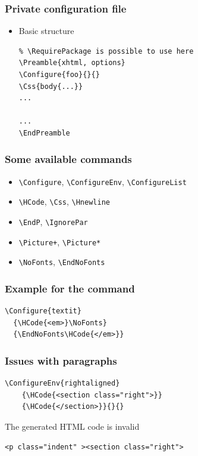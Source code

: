 \begin{frame}[fragile]
  \frametitle{Private configuration file}
  \begin{itemize}
    \item Basic structure
      \begin{verbatim}
% \RequirePackage is possible to use here
\Preamble{xhtml, options}
\Configure{foo}{}{}
\Css{body{...}}
...

...
\EndPreamble
      \end{verbatim}
  \end{itemize}
\end{frame}



\begin{frame}[fragile]
  \frametitle{Some available commands}
  \begin{itemize} 
  \item \verb|\Configure|, \verb|\ConfigureEnv|, \verb|\ConfigureList|
  \item \verb|\HCode|, \verb|\Css|, \verb|\Hnewline|
  \item \verb|\EndP|, \verb|\IgnorePar|
  \item \verb|\Picture+|, \verb|\Picture*|
  \item \verb|\NoFonts|, \verb|\EndNoFonts|
\end{itemize}
\end{frame}

\begin{frame}[fragile]
  \frametitle{Example for the \texttt{\string\Configure} command}
  \begin{priklad}
\begin{verbatim}
\Configure{textit}
  {\HCode{<em>}\NoFonts}
  {\EndNoFonts\HCode{</em>}}
\end{verbatim}
  \end{priklad}
\end{frame}


\begin{frame}[fragile]
  \frametitle{Issues with paragraphs}
  \begin{priklad}
\begin{verbatim}
\ConfigureEnv{rightaligned}
    {\HCode{<section class="right">}}
    {\HCode{</section>}}{}{}
\end{verbatim}
\end{priklad}
The generated HTML code is invalid
\begin{priklad}
\begin{verbatim}
<p class="indent" ><section class="right">
\end{verbatim}
\end{priklad}
\end{frame}

